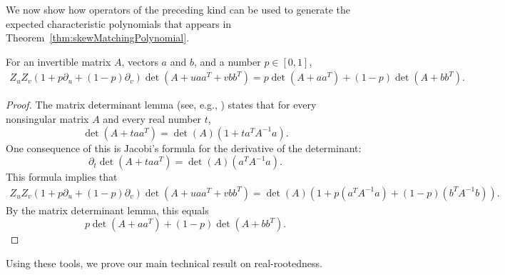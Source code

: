 \documentclass[11pt]{article}
\newcommand{\mydet}[1]{\det\left(#1\right)}
\begin{document}
We now show how operators of the preceding kind can be used to generate the
  expected characteristic polynomials that appears in Theorem~\ref{thm:skewMatchingPolynomial}.
\begin{lemma}\label{lem:Toper}
For an invertible matrix $A$, vectors $a$ and $b$, and a number $p \in [0,1]$,
\begin{multline*}
Z_{u} Z_{v} (1 + p \partial_{u} + (1-p) \partial_{v})
\mydet{A + u a a^{T} + v b b^{T}} = 
p \mydet{A + a a^{T}} + (1-p) \mydet{A + b b^{T}}.
\end{multline*}
\end{lemma}
\begin{proof}
The matrix determinant lemma (see, e.g., \cite{harville2008matrix}) states that for every nonsingular matrix $A$ and every real number $t$,
\[
  \mydet{A + t a a^{T}} = \mydet{A} (1 + t a^{T} A^{-1} a).
\]
One consequence of this is Jacobi's formula for the derivative of the determinant:
\[
  \partial_{t} \mydet{A + t a a^{T}} = \mydet{A} (a^{T} A^{-1} a).
\]
This formula implies that
\begin{multline*}
Z_{u} Z_{v} (1 + p \partial_{u} + (1-p) \partial_{v})
\mydet{A + u a a^{T} + v b b^{T}}
= \mydet{A}
\left(
1 +
p  (a^{T} A^{-1} a)
+
(1-p)  (b^{T} A^{-1} b)
 \right).
\end{multline*}
By the matrix determinant lemma, this equals
\[
  p \mydet{A + a a^{T}} + (1-p) \mydet{A + b b^{T}}.
\]
\end{proof}


Using these tools, we prove our main technical result on real-rootedness. 
\end{document}
